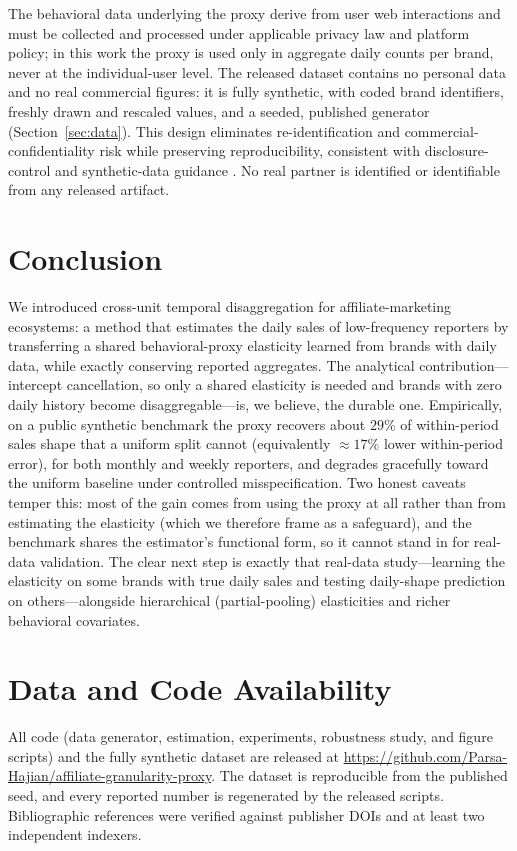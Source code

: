 \documentclass[11pt]{article}
\begin{document}
The behavioral data underlying the proxy derive from user web interactions and
must be collected and processed under applicable privacy law and platform
policy; in this work the proxy is used only in aggregate daily counts per brand,
never at the individual-user level. The released dataset contains no personal
data and no real commercial figures: it is fully synthetic, with coded brand
identifiers, freshly drawn and rescaled values, and a seeded, published
generator (Section~\ref{sec:data}). This design eliminates re-identification and
commercial-confidentiality risk while preserving reproducibility, consistent
with disclosure-control and synthetic-data guidance
\citep{Hundepool2012,FigueiraVaz2022}. No real partner is identified or
identifiable from any released artifact.

\section{Conclusion}\label{sec:conclusion}

We introduced cross-unit temporal disaggregation for affiliate-marketing
ecosystems: a method that estimates the daily sales of low-frequency reporters
by transferring a shared behavioral-proxy elasticity learned from brands with
daily data, while exactly conserving reported aggregates. The analytical
contribution---intercept cancellation, so only a shared elasticity is needed and
brands with zero daily history become disaggregable---is, we believe, the
durable one. Empirically, on a public synthetic benchmark the proxy recovers
about $29\%$ of within-period sales shape that a uniform split cannot
(equivalently $\approx17\%$ lower within-period error), for both monthly and
weekly reporters, and degrades gracefully toward the uniform baseline under
controlled misspecification. Two honest caveats temper this: most of the gain
comes from using the proxy at all rather than from estimating the elasticity
(which we therefore frame as a safeguard), and the benchmark shares the
estimator's functional form, so it cannot stand in for real-data validation.
The clear next step is exactly that real-data study---learning the elasticity on
some brands with true daily sales and testing daily-shape prediction on
others---alongside hierarchical (partial-pooling) elasticities and richer
behavioral covariates.

\section*{Data and Code Availability}
All code (data generator, estimation, experiments, robustness study, and figure
scripts) and the fully synthetic dataset are released at
\url{https://github.com/Parsa-Hajian/affiliate-granularity-proxy}.
The dataset is reproducible from the published seed, and every reported number
is regenerated by the released scripts. Bibliographic references were verified
against publisher DOIs and at least two independent indexers.
\end{document}

